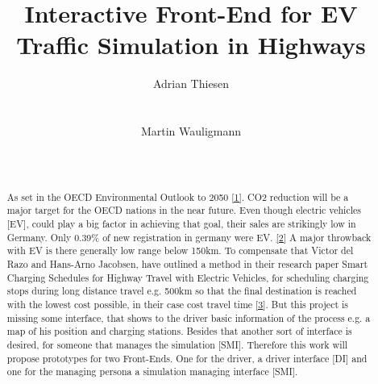 \documentclass{sig-alternate}
\begin{document}
\title{Interactive Front-End for EV Traffic Simulation in Highways}



\author{
\alignauthor Adrian Thiesen\\
       \\
       \\
\alignauthor Martin Wauligmann\\
       \\
       \\
}


\maketitle


\begin{abstract}

As set in the OECD Environmental Outlook to 2050 \href{https://www.oecd.org/env/cc/49082173.pdf}{[1]}.
CO2 reduction will be a major target for the OECD nations in the near future. Even though electric vehicles [EV],
could play a big factor in achieving that goal, their sales are strikingly low in Germany.
Only 0.39\% of new registration in germany were EV.
\href{http://www.kba.de/DE/Statistik/Fahrzeuge/Neuzulassungen/neuzulassungen_node.html}{[2]}
A major throwback with EV is there generally low range below 150km.
To compensate that Victor del Razo and Hans-Arno Jacobsen, have outlined a method in their research paper
Smart Charging Schedules for Highway Travel with Electric Vehicles, for scheduling charging stops during
long distance travel e.g. 500km  so that the final destination is reached with the lowest cost possible,
in their case cost travel time \href{https://www.i13.in.tum.de/fileadmin/w00bof/www/PDF/TTE_2016.pdf}{[3}].
But this project is missing some interface, that shows to the driver  basic information of the process e.g.
a map of his position and charging stations. Besides that another sort of interface is desired, for someone
that manages the simulation [SMI].
Therefore this work will propose prototypes for two Front-Ends.
One for the driver, a driver interface [DI] and one for the managing persona a simulation managing interface [SMI].

\end{abstract}
\end{document}
